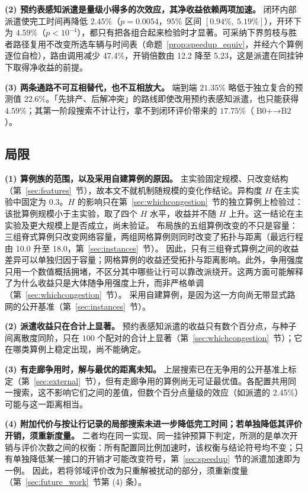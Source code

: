 \documentclass[manuscript,screen,review]{acmart}
\newcommand{\NPairs}{100}
\newcommand{\GainLoopProbe}{17.75\%}     %
\newcommand{\GainProbeOpen}{4.59\%}      %
\newcommand{\PProbeOpen}{<10^{-4}}
\newcommand{\GainProbeLoop}{2.45\%}      %
\newcommand{\PProbeLoop}{=0.0054}
\newcommand{\GainEndToEnd}{21.35\%}      %
\newcommand{\CIProbeLoop}{$[0.94\%,\ 5.19\%]$}
\newcommand{\GainIndepProduct}{22.6\%}
\newcommand{\LegDumbbell}{10.0}          %
\newcommand{\LegGrid}{18.0}              %
\newcommand{\RouteCallCut}{47.4\%}
\newcommand{\CostMultBefore}{12.2}
\newcommand{\CostMultAfter}{5.23}
\begin{document}
\textbf{(2) 预约表感知派遣是量级小得多的次效应，其净收益依赖两项加速。}
闭环内部派遣使完工时间再降低 $\GainProbeLoop$（$p\PProbeLoop$，$95\%$ 区间 \CIProbeLoop{}），开环下为 $\GainProbeOpen$（$p\PProbeOpen$），都只有把各组合起来检验时才显著。可采纳下界剪枝与胜者路径复用不改变所选车辆与时间表（命题~\ref{prop:speedup_equiv}，并经六个算例逐位自检），路由调用减少 \RouteCallCut{}，开销倍数由 \CostMultBefore{} 降至 \CostMultAfter{}，这是派遣在同挂钟下取得净收益的前提。

\textbf{(3) 两条通路不可互相替代，也不互相放大。}
端到端 $\GainEndToEnd$ 略低于独立复合的预测值 $\GainIndepProduct$。「先排产、后解冲突」的路线即使改用预约表感知派遣，也只能获得 $\GainProbeOpen$；其第一阶段搜索不计让行，拿不到闭环评价带来的 $\GainLoopProbe$（$\text{B0+}\to\text{B2}$）。

\subsection{局限}
\label{sec:limitations}

\textbf{(1) 算例族的范围，以及采用自建算例的原因。}
主实验固定规模、只改变结构（第~\ref{sec:features}~节），故本文不就机制随规模的变化作结论。异构度 $H$ 在主实验中固定为 $0.3$。$H$ 的影响只在第~\ref{sec:whichcongestion}~节的独立算例上检验过：该批算例规模小于主实验，取了四个 $H$ 水平，收益并不随 $H$ 上升。这一结论在主实验及更大规模上是否成立，尚未验证。
布局族的五组算例改变的不只是容量：三组脊式算例只改变网络容量，两组网格算例则同时改变了拓扑与距离（最远行程由 \LegDumbbell{} 升至 \LegGrid{}，第~\ref{sec:instances}~节）。
因此，只有三组脊式算例之间的收益差异可以单独归因于容量；网格算例的收益还受拓扑与距离影响。此外，争用强度只用一个数值概括拥堵，不区分其中哪些让行可以靠改派绕开。这两方面可能解释了为什么收益只是大体随争用强度上升，而非严格单调（第~\ref{sec:whichcongestion}~节）。
采用自建算例，是因为这一方向尚无带显式路网的公开基准（第~\ref{sec:instances}~节）。

\textbf{(2) 派遣收益只在合计上显著。}
预约表感知派遣的收益只有数个百分点，与种子间离散度同阶，只在 $\NPairs$ 个配对的合计上显著（第~\ref{sec:whichcongestion}~节）；它在哪类算例上稳定出现，尚不能确定。

\textbf{(3) 有走廊争用时，解与最优的距离未知。}
上层搜索已在无争用的公开基准上标定（第~\ref{sec:external}~节），但有走廊争用的算例尚无可证最优值。各配置共用同一搜索，这不影响它们之间的差值，但数个百分点量级的效应（如派遣的 \GainProbeLoop{}）可能与这一距离相当。

\textbf{(4) 附加代价与按让行记录的局部搜索未进一步降低完工时间；若单独降低其评价开销，须重新度量。}
二者均在同一实现、同一挂钟预算下判定，所测的是单次开销与评价次数之间的权衡：所有配置同比例加速时，该权衡与结论符号均不变；只有单独降低某一接口的开销才可能改变符号，第~\ref{sec:speedup}~节的派遣加速即为一例。
因此，若将邻域评价改为只重解被扰动的部分，须重新度量（第~\ref{sec:future_work}~节第 (4) 条）。
\end{document}
